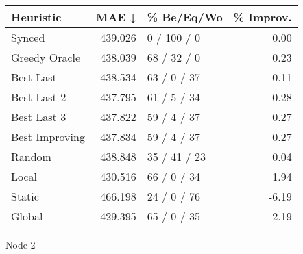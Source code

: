 \begin{tabular}{lrlr}
\toprule
\textbf{Heuristic} & \textbf{MAE ↓} & \textbf{\% Be/Eq/Wo} & \textbf{\% Improv.} \\
\midrule
            Synced &        439.026 &          0 / 100 / 0 &                0.00 \\
     Greedy Oracle &        438.039 &          68 / 32 / 0 &                0.23 \\
         Best Last &        438.534 &          63 / 0 / 37 &                0.11 \\
       Best Last 2 &        437.795 &          61 / 5 / 34 &                0.28 \\
       Best Last 3 &        437.822 &          59 / 4 / 37 &                0.27 \\
    Best Improving &        437.834 &          59 / 4 / 37 &                0.27 \\
            Random &        438.848 &         35 / 41 / 23 &                0.04 \\
             Local &        430.516 &          66 / 0 / 34 &                1.94 \\
            Static &        466.198 &          24 / 0 / 76 &               -6.19 \\
            Global &        429.395 &          65 / 0 / 35 &                2.19 \\
\bottomrule
\end{tabular}
\caption{Node 2}
\label{tab:iid_lr01_le1_bs4_2}
